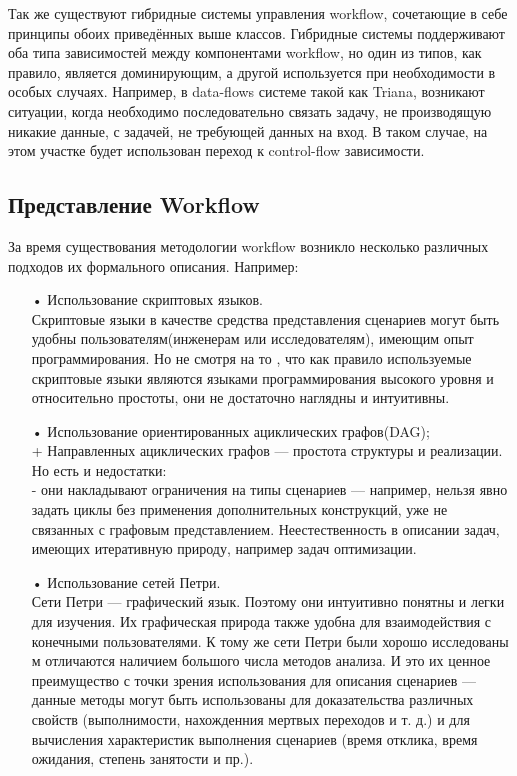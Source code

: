 \documentclass[a4paper,14pt]{article}
\begin{document}
Так же существуют гибридные системы управления workflow, сочетающие в себе принципы обоих приведённых выше классов. Гибридные системы поддерживают оба типа зависимостей между компонентами workflow, но  один из типов, как правило, является доминирующим, а другой используется при необходимости  в особых случаях. Например, в data-flows системе такой как Triana, возникают ситуации, когда необходимо последовательно связать задачу, не производящую никакие данные, с задачей, не  требующей данных на вход. В таком случае, на этом участке будет использован переход к control-flow зависимости.\\
  
\subsection*{Представление Workflow}
За время существования методологии workflow возникло несколько различных подходов их формального описания. Например:
\begin{enumerate}
\item[•] Использование скриптовых языков.\\
 Скриптовые языки в качестве средства представления сценариев могут быть удобны пользователям(инженерам или исследователям), имеющим опыт программирования. Но не смотря на то , что как правило используемые  скриптовые языки являются языками программирования высокого уровня и относительно простоты, они не достаточно наглядны и интуитивны.\\
\item[•] Использование ориентированных ациклических графов(DAG);\\
 + Направленных ациклических графов — простота структуры и реализации.
  Но есть и недостатки:\\
  - они накладывают ограничения на типы сценариев — например, нельзя явно задать циклы без применения дополнительных конструкций, уже не связанных с графовым представлением. Неестественность в описании задач, имеющих итеративную природу, например задач оптимизации. \\
\item[•] Использование сетей Петри.\\ 
 Сети Петри — графический язык. Поэтому они
интуитивно понятны и легки для изучения. Их графическая природа
также удобна для взаимодействия с конечными пользователями. К тому же сети Петри были хорошо исследованы м отличаются наличием большого числа методов анализа. И это их ценное преимущество с точки зрения использования для
описания сценариев — данные методы могут быть использованы для доказательства различных свойств (выполнимости, нахожденния  мертвых переходов и т. д.) и для вычисления характеристик выполнения сценариев (время отклика, время ожидания, степень занятости и пр.).
\end{enumerate}
\end{document}
